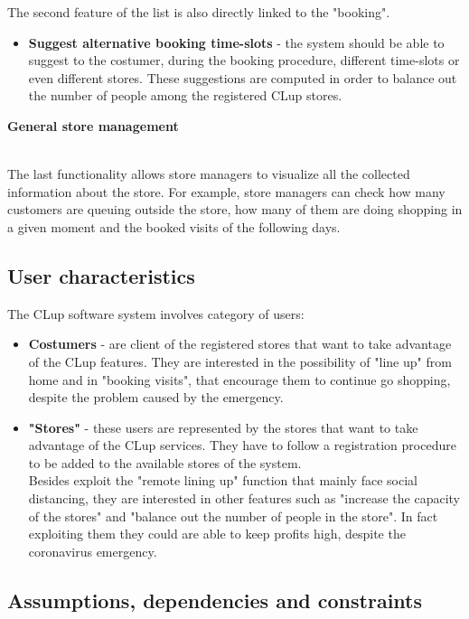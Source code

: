 \documentclass[]{article}
\begin{document}
The second feature of the list is also directly linked to the "booking".
\begin{itemize}
	\renewcommand{\labelitemi}{$-$}
	\item \textbf{Suggest alternative booking time-slots} - the system should be able to suggest to the costumer, during the booking procedure, different time-slots or even different stores. These suggestions are computed in order to balance out the number of people among the registered CLup stores.
\end{itemize}
\bigskip
\begin{large}
	\textbf{General store management}
\end{large}
\smallskip
\\
The last functionality allows store managers to visualize all the collected information about the store. For example, store managers can check how many customers are queuing outside the store, how many of them are doing shopping in a given moment and the booked visits of the following days.  

\newpage

\subsection{User characteristics}
The CLup software system involves category of users:
\begin{itemize}
	\renewcommand{\labelitemi}{$-$}
	\item \textbf{Costumers} - are client of the registered stores that want to take advantage of the CLup features. They are interested in the possibility of "line up" from home and in "booking visits", that encourage them to continue go shopping, despite the problem caused by the emergency.
	
	\item \textbf{"Stores"} - these users are represented by the stores that want to take advantage of the CLup services. They have to follow a registration procedure to be added to the available stores of the system. 
	\\Besides exploit the "remote lining up" function that mainly face social distancing, they are interested in other features such as "increase the capacity of the stores" and "balance out the number of people in the store". In fact exploiting them they could are able to keep profits high, despite the coronavirus emergency. 		
\end{itemize}


\subsection{Assumptions, dependencies and constraints}
\end{document}
